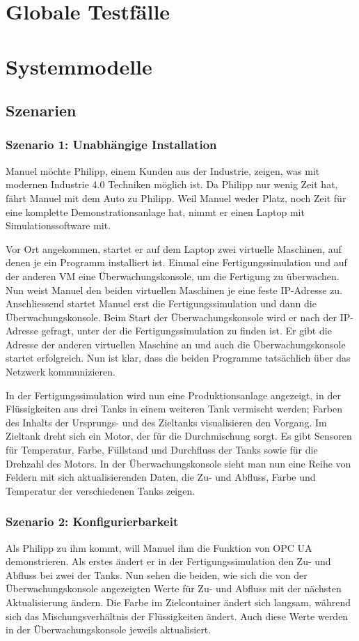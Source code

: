 \documentclass[parskip=full]{scrartcl}
\begin{document}
\section{Globale Testfälle}
\Blindtext[1]

\section{Systemmodelle}
\subsection{Szenarien}
\subsubsection{Szenario 1: Unabhängige Installation}
Manuel möchte Philipp, einem Kunden aus der Industrie, zeigen, was mit modernen Industrie 4.0 Techniken möglich ist.
Da Philipp nur wenig Zeit hat, fährt Manuel mit dem Auto zu Philipp. Weil Manuel weder Platz, 
noch Zeit für eine komplette Demonstrationsanlage hat, nimmt er einen Laptop mit Simulationssoftware mit.

Vor Ort angekommen, startet er auf dem Laptop zwei virtuelle Maschinen, auf denen je ein Programm installiert ist. 
Einmal eine Fertigungssimulation und auf der anderen VM eine Überwachungskonsole, um die Fertigung zu überwachen.
Nun weist Manuel den beiden virtuellen Maschinen je eine feste IP-Adresse zu.
Anschliessend startet Manuel erst die Fertigungssimulation und dann die Überwachungskonsole.
Beim Start der Überwachungskonsole wird er nach der IP-Adresse gefragt, unter der die Fertigungssimulation zu finden ist. 
Er gibt die Adresse der anderen virtuellen Maschine an und auch die Überwachungskonsole startet erfolgreich. 
Nun ist klar, dass die beiden Programme tatsächlich über das Netzwerk kommunizieren.

In der Fertigungssimulation wird nun eine Produktionsanlage angezeigt, in der Flüssigkeiten aus drei Tanks
in einem weiteren Tank vermischt werden; Farben des Inhalts der Ursprungs- und des Zieltanks visualisieren den Vorgang. 
Im Zieltank dreht sich ein Motor, der für die Durchmischung sorgt.
Es gibt Sensoren für Temperatur, Farbe, Füllstand und Durchfluss der Tanks sowie für die Drehzahl des Motors.
In der Überwachungskonsole sieht man nun eine Reihe von Feldern mit sich aktualisierenden Daten,
die Zu- und Abfluss, Farbe und Temperatur der verschiedenen Tanks zeigen.
\subsubsection{Szenario 2: Konfigurierbarkeit}
Als Philipp zu ihm kommt, will Manuel ihm die Funktion von OPC UA demonstrieren.
Als erstes ändert er in der Fertigungssimulation den Zu- und Abfluss bei zwei der Tanks. Nun sehen die beiden, wie
sich die von der Überwachungskonsole angezeigten Werte für Zu- und Abfluss mit der nächsten Aktualisierung ändern. Die
Farbe im Zielcontainer ändert sich langsam, während sich das Mischungsverhältnis der Flüssigkeiten ändert. Auch diese
Werte werden in der Überwachungskonsole jeweils aktualisiert.
\end{document}
